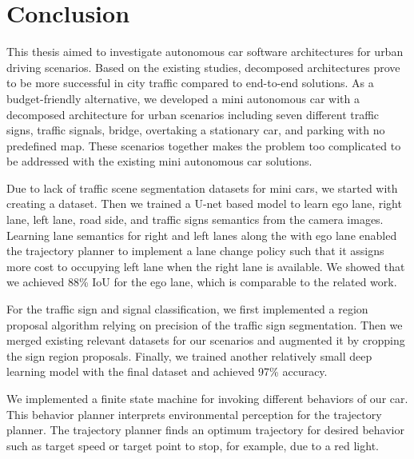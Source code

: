 \chapter{Conclusion}
\label{chp:b7}

This thesis aimed to investigate autonomous car software architectures for
urban driving scenarios. Based on the existing studies, decomposed
architectures prove to be more successful in city traffic compared to
end-to-end solutions. As a budget-friendly alternative, we developed a mini
autonomous car with a decomposed architecture for urban scenarios including
seven different traffic signs, traffic signals, bridge, overtaking a stationary
car, and parking with no predefined map. These scenarios together makes the
problem too complicated to be addressed with the existing mini autonomous car
solutions.

Due to lack of traffic scene segmentation datasets for mini cars, we started
with creating a dataset. Then we trained a U-net based model to learn ego lane,
right lane, left lane, road side, and traffic signs semantics from the camera
images. Learning lane semantics for right and left lanes along the with ego
lane enabled the trajectory planner to implement a lane change policy such that
it assigns more cost to occupying left lane when the right lane is available.
We showed that we achieved 88\% IoU for the ego lane, which is comparable to
the related work.

For the traffic sign and signal classification, we first implemented a region
proposal algorithm relying on precision of the traffic sign segmentation. Then
we merged existing relevant datasets for our scenarios and augmented it by
cropping the sign region proposals. Finally, we trained another relatively
small deep learning model with the final dataset and achieved 97\% accuracy.

We implemented a finite state machine for invoking different behaviors of our
car. This behavior planner interprets environmental perception for the
trajectory planner. The trajectory planner finds an optimum trajectory for
desired behavior such as target speed or target point to stop, for example, due
to a red light.

